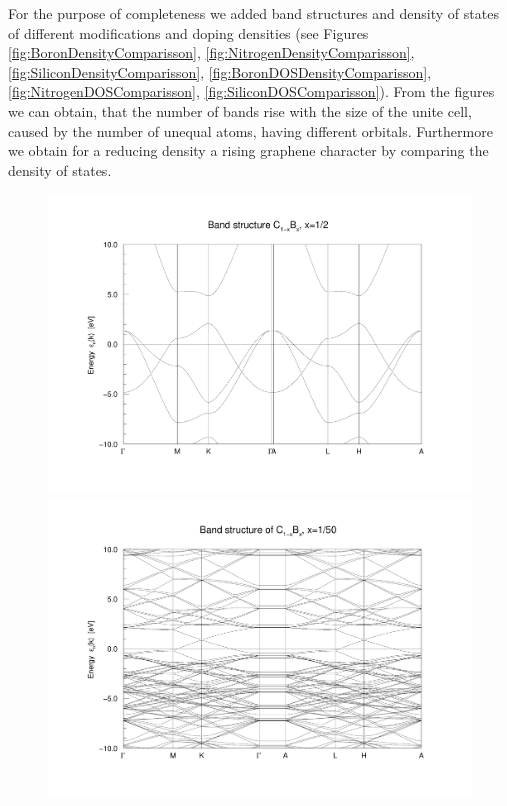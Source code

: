 				For the purpose of completeness we added band structures and density of states of different modifications and doping densities (see Figures \ref{fig:BoronDensityComparisson}, \ref{fig:NitrogenDensityComparisson}, \ref{fig:SiliconDensityComparisson}, \ref{fig:BoronDOSDensityComparisson}, \ref{fig:NitrogenDOSComparisson}, \ref{fig:SiliconDOSComparisson}). From the figures we can obtain, that the number of bands rise with the size of the unite cell, caused by the number of unequal atoms, having different orbitals. Furthermore we obtain for a reducing density a rising graphene character by comparing the density of states.
				\begin{figure}
					\begin{minipage}[t]{0.9\textwidth}
						\includegraphics[width=\textwidth]{Results/Bor/Bor1/bor1band.pdf}
					\end{minipage}
					\begin{minipage}[t]{0.9\textwidth}
						\includegraphics[width=\textwidth]{Results/Bor/Bor5/bor5band.pdf}

\end{minipage}
\end{figure}
